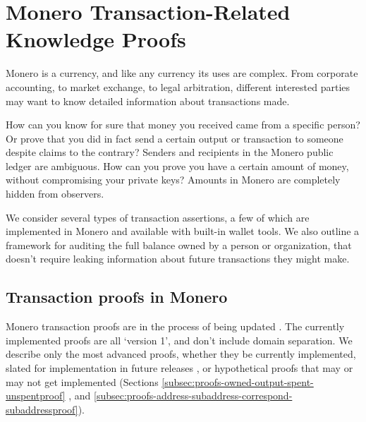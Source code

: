\chapter{Monero Transaction-Related Knowledge Proofs}
\label{chapter:tx-knowledge-proofs}

\iffalse
https://github.com/monero-project/monero/pull/6329/files

https://monero.stackexchange.com/questions/8122/what-is-the-spendproofv1-or-outproofv1-in-the-details-of-a-sent-transa

https://monero.stackexchange.com/questions/9991/how-does-the-get-reserve-proof-command-work

https://github.com/monero-project/research-lab/issues/68
\fi

Monero is a currency, and like any currency its uses are complex. From corporate accounting, to market exchange, to legal arbitration, different interested parties may want to know detailed information about transactions made.

How can you know for sure that money you received came from a specific person? Or prove that you did in fact send a certain output or transaction to someone despite claims to the contrary? Senders and recipients in the Monero public ledger are ambiguous. How can you prove you have a certain amount of money, without compromising your private keys? Amounts in Monero are completely hidden from observers.

We consider several types of transaction assertions, a few of which are implemented in Monero and available with built-in wallet tools. We also outline a framework for auditing the full balance owned by a person or organization, that doesn't require leaking information about future transactions they might make.



\section{Transaction proofs in Monero}
\label{sec:proofs-monero-proofs}

Monero transaction proofs are in the process of being updated \cite{sarang-txproofs-updates-issue}. The currently implemented proofs are all `version 1', and don't include domain separation. We describe only the most advanced proofs, whether they be currently implemented, slated for implementation in future releases \cite{sarang-txproofs-v2-update-pr}, or hypothetical proofs that may or may not get implemented (Sections \ref{subsec:proofs-owned-output-spent-unspentproof} \cite{unspent-proof-issue-68}, and \ref{subsec:proofs-address-subaddress-correspond-subaddressproof}).


